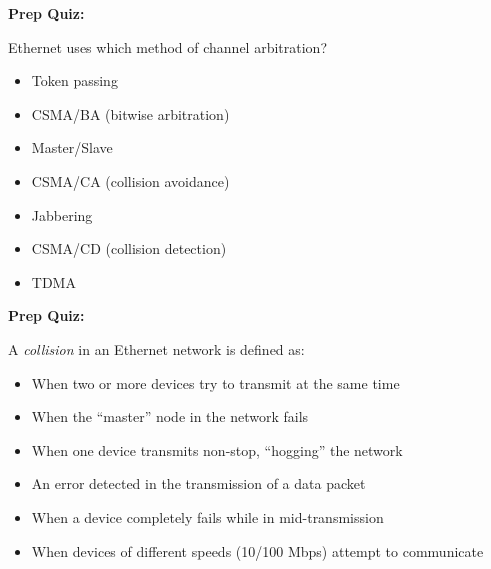 \vfil \eject

\noindent
{\bf Prep Quiz:}

Ethernet uses which method of channel arbitration?

\begin{itemize}
\item{} Token passing
\vskip 5pt 
\item{} CSMA/BA (bitwise arbitration)
\vskip 5pt 
\item{} Master/Slave
\vskip 5pt 
\item{} CSMA/CA (collision avoidance)
\vskip 5pt 
\item{} Jabbering
\vskip 5pt 
\item{} CSMA/CD (collision detection)
\vskip 5pt 
\item{} TDMA
\end{itemize}






\vfil \eject

\noindent
{\bf Prep Quiz:}

A {\it collision} in an Ethernet network is defined as:

\begin{itemize}
\item{} When two or more devices try to transmit at the same time
\vskip 5pt 
\item{} When the ``master'' node in the network fails
\vskip 5pt 
\item{} When one device transmits non-stop, ``hogging'' the network
\vskip 5pt 
\item{} An error detected in the transmission of a data packet
\vskip 5pt 
\item{} When a device completely fails while in mid-transmission
\vskip 5pt 
\item{} When devices of different speeds (10/100 Mbps) attempt to communicate
\end{itemize}





